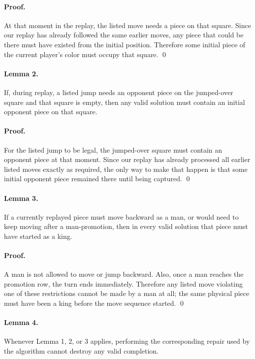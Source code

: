 \documentclass[11pt]{article}
\begin{document}
\paragraph{Proof.}
At that moment in the replay, the listed move needs a piece on that square. Since our replay has already followed the same earlier moves, any piece that could be there must have existed from the initial position. Therefore some initial piece of the current player's color must occupy that square. \qed

\paragraph{Lemma 2.}
If, during replay, a listed jump needs an opponent piece on the jumped-over square and that square is empty, then any valid solution must contain an initial opponent piece on that square.

\paragraph{Proof.}
For the listed jump to be legal, the jumped-over square must contain an opponent piece at that moment. Since our replay has already processed all earlier listed moves exactly as required, the only way to make that happen is that some initial opponent piece remained there until being captured. \qed

\paragraph{Lemma 3.}
If a currently replayed piece must move backward as a man, or would need to keep moving after a man-promotion, then in every valid solution that piece must have started as a king.

\paragraph{Proof.}
A man is not allowed to move or jump backward. Also, once a man reaches the promotion row, the turn ends immediately. Therefore any listed move violating one of these restrictions cannot be made by a man at all; the same physical piece must have been a king before the move sequence started. \qed

\paragraph{Lemma 4.}
Whenever Lemma 1, 2, or 3 applies, performing the corresponding repair used by the algorithm cannot destroy any valid completion.
\end{document}
